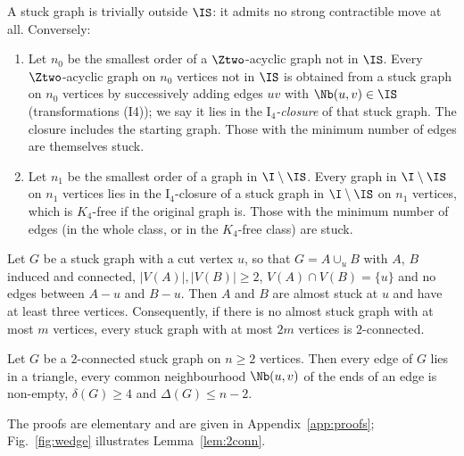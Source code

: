 A stuck graph is trivially outside $\IS$: it admits no strong contractible move at all. Conversely:

\begin{lemma}\label{lem:stuck}
\begin{enumerate}[label=(\alph*)]
\item Let $n_0$ be the smallest order of a $\Ztwo$-acyclic graph not in $\IS$. Every $\Ztwo$-acyclic graph on $n_0$ vertices not in $\IS$ is obtained from a stuck graph on $n_0$ vertices by successively adding edges $uv$ with $\Nb(u,v)\in\IS$ (transformations (I4)); we say it lies in the \emph{$\mathrm{I}_4$-closure} of that stuck graph. The closure includes the starting graph. Those with the minimum number of edges are themselves stuck.
\item Let $n_1$ be the smallest order of a graph in $\I\setminus\IS$. Every graph in $\I\setminus\IS$ on $n_1$ vertices lies in the $\mathrm{I}_4$-closure of a stuck graph in $\I\setminus\IS$ on $n_1$ vertices, which is $K_4$-free if the original graph is. Those with the minimum number of edges (in the whole class, or in the $K_4$-free class) are stuck.
\end{enumerate}
\end{lemma}

\begin{lemma}\label{lem:2conn}
Let $G$ be a stuck graph with a cut vertex $u$, so that $G=A\cup_u B$ with $A$, $B$ induced and connected, $|V(A)|,|V(B)|\ge2$, $V(A)\cap V(B)=\{u\}$ and no edges between $A-u$ and $B-u$. Then $A$ and $B$ are almost stuck at $u$ and have at least three vertices. Consequently, if there is no almost stuck graph with at most $m$ vertices, every stuck graph with at most $2m$ vertices is $2$-connected.
\end{lemma}

\begin{lemma}\label{lem:degrees}
Let $G$ be a $2$-connected stuck graph on $n\ge 2$ vertices. Then every edge of $G$ lies in a triangle, every common neighbourhood $\Nb(u,v)$ of the ends of an edge is non-empty, $\delta(G)\ge 4$ and $\Delta(G)\le n-2$.
\end{lemma}

The proofs are elementary and are given in Appendix~\ref{app:proofs}; Fig.~\ref{fig:wedge} illustrates Lemma~\ref{lem:2conn}.

